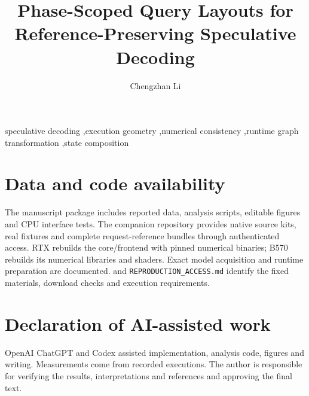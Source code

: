 \documentclass[final,5p,times,twocolumn]{elsarticle}
\begin{document}
\begin{frontmatter}
\title{Phase-Scoped Query Layouts for Reference-Preserving Speculative Decoding}
\author{Chengzhan Li}
\address{University of Electronic Science and Technology of China, Chengdu, China\\[2pt]
{\normalfont\ttfamily\href{mailto:chengzhan.li@std.uestc.edu.cn}{chengzhan.li@std.uestc.edu.cn}}}
\begin{abstract}\end{abstract}
\begin{keyword}
speculative decoding \sep execution geometry \sep numerical consistency \sep runtime graph transformation \sep state composition
\end{keyword}
\end{frontmatter}












\section*{Data and code availability}
The manuscript package includes reported data, analysis scripts, editable figures and CPU interface tests. The companion repository provides native source kits, real fixtures and complete request-reference bundles through authenticated access. RTX rebuilds the core/frontend with pinned numerical binaries; B570 rebuilds its numerical libraries and shaders. Exact model acquisition and runtime preparation are documented.  and \texttt{REPRODUCTION\_ACCESS.md} identify the fixed materials, download checks and execution requirements.
\section*{Declaration of AI-assisted work}
OpenAI ChatGPT and Codex assisted implementation, analysis code, figures and writing. Measurements come from recorded executions. The author is responsible for verifying the results, interpretations and references and approving the final text.
\let\hsoriginalbibitem\bibitem
\renewcommand{\bibitem}{\stepcounter{hsbibitem}\ifnum\value{hsbibitem}=25\balance\fi\hsoriginalbibitem}
\setlength{\bibsep}{0pt plus .2pt minus .2pt}


\clearpage
\nobalance











\balance

\end{document}

